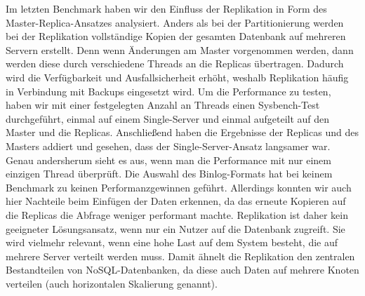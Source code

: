 Im letzten Benchmark haben wir den Einfluss der Replikation in Form des Master-Replica-Ansatzes analysiert.
Anders als bei der Partitionierung werden bei der Replikation vollständige Kopien der gesamten Datenbank auf mehreren Servern erstellt.
Denn wenn Änderungen am Master vorgenommen werden, dann werden diese durch verschiedene Threads an die Replicas übertragen.
Dadurch wird die Verfügbarkeit und Ausfallsicherheit erhöht, weshalb Replikation häufig in Verbindung mit Backups eingesetzt wird.
Um die Performance zu testen, haben wir mit einer festgelegten Anzahl an Threads einen Sysbench-Test durchgeführt, einmal auf einem Single-Server und einmal aufgeteilt auf den Master und die Replicas.
Anschließend haben die Ergebnisse der Replicas und des Masters addiert und gesehen, dass der Single-Server-Ansatz langsamer war.
Genau andersherum sieht es aus, wenn man die Performance mit nur einem einzigen Thread überprüft.
Die Auswahl des Binlog-Formats hat bei keinem Benchmark zu keinen Performanzgewinnen geführt.
Allerdings konnten wir auch hier Nachteile beim Einfügen der Daten erkennen, da das erneute Kopieren auf die Replicas die Abfrage weniger performant machte.
Replikation ist daher kein geeigneter Lösungsansatz, wenn nur ein Nutzer auf die Datenbank zugreift.
Sie wird vielmehr relevant, wenn eine hohe Last auf dem System besteht, die auf mehrere Server verteilt werden muss.
Damit ähnelt die Replikation den zentralen Bestandteilen von NoSQL-Datenbanken, da diese auch Daten auf mehrere Knoten verteilen (auch horizontalen Skalierung genannt).